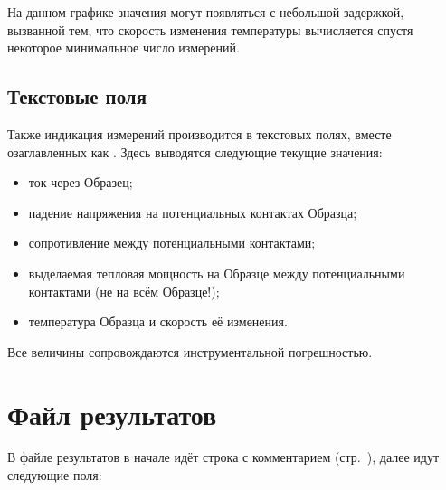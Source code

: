 \documentclass[12pt, a4paper, twocolumn]{report}
\begin{document}
На данном графике значения могут появляться с небольшой задержкой, вызванной тем, что скорость изменения температуры вычисляется спустя некоторое минимальное число измерений.

\subsection{Текстовые поля}

Также индикация измерений производится в текстовых полях, вместе озаглавленных как . Здесь выводятся следующие текущие значения:

\begin{itemize}
\item ток через Образец;
\item падение напряжения на потенциальных контактах Образца;
\item сопротивление между потенциальными контактами;
\item выделаемая тепловая мощность на Образце между потенциальными контактами (не на всём Образце!);
\item температура Образца и скорость её изменения.
\end{itemize}

Все величины сопровождаются инструментальной погрешностью.

\section{Файл результатов}

В файле результатов в начале идёт строка с комментарием (стр.~\pageref{sec_dut_comment}), далее идут следующие поля:
\end{document}
